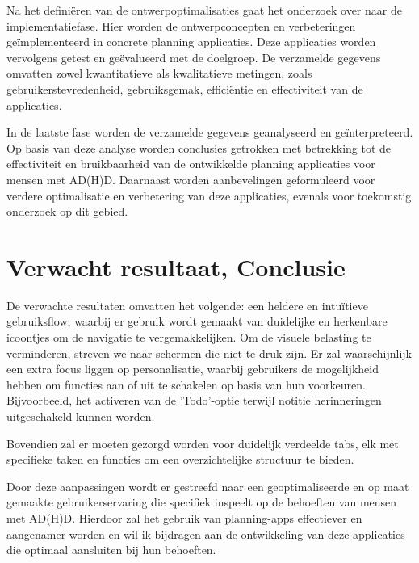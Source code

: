 Na het definiëren van de ontwerpoptimalisaties gaat het onderzoek over naar de implementatiefase. Hier worden de ontwerpconcepten en verbeteringen geïmplementeerd in concrete planning applicaties. Deze applicaties worden vervolgens getest en geëvalueerd met de doelgroep. De verzamelde gegevens omvatten zowel kwantitatieve als kwalitatieve metingen, zoals gebruikerstevredenheid, gebruiksgemak, efficiëntie en effectiviteit van de applicaties. \newline 

In de laatste fase worden de verzamelde gegevens geanalyseerd en geïnterpreteerd. Op basis van deze analyse worden conclusies getrokken met betrekking tot de effectiviteit en bruikbaarheid van de ontwikkelde planning applicaties voor mensen met AD(H)D. Daarnaast worden aanbevelingen geformuleerd voor verdere optimalisatie en verbetering van deze applicaties, evenals voor toekomstig onderzoek op dit gebied.


\section{Verwacht resultaat, Conclusie}%
\label{sec:verwachte_resultaten_conclusie}

De verwachte resultaten omvatten het volgende: een heldere en intuïtieve gebruiksflow, waarbij er gebruik wordt gemaakt van duidelijke en herkenbare icoontjes om de navigatie te vergemakkelijken. Om de visuele belasting te verminderen, streven we naar schermen die niet te druk zijn. \newline
Er zal waarschijnlijk een extra focus liggen op personalisatie, waarbij gebruikers de mogelijkheid hebben om functies aan of uit te schakelen op basis van hun voorkeuren. Bijvoorbeeld, het activeren van de 'Todo'-optie terwijl notitie herinneringen uitgeschakeld kunnen worden. \newline

Bovendien zal er moeten gezorgd worden voor duidelijk verdeelde tabs, elk met specifieke taken en functies om een overzichtelijke structuur te bieden. \newline
 
Door deze aanpassingen wordt er gestreefd naar een geoptimaliseerde en op maat gemaakte gebruikerservaring die specifiek inspeelt op de behoeften van mensen met AD(H)D. Hierdoor zal het gebruik van planning-apps effectiever en aangenamer worden en wil ik bijdragen aan de ontwikkeling van deze applicaties die optimaal aansluiten bij hun behoeften.

